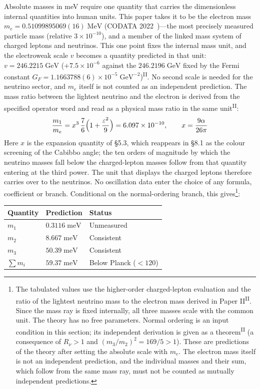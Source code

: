 \documentclass[12pt,a4paper]{article}
\newcommand{\PII}{\textsuperscript{\textup{II}}}
\begin{document}
\begin{sloppypar}
Absolute masses in meV require one quantity that carries the dimensionless internal quantities into human units. This paper takes it to be the electron mass $m_e = 0.51099895069(16)\;\mathrm{MeV}$ (CODATA 2022~\cite{codata})---the most precisely measured particle mass (relative $3\times10^{-10}$), and a member of the linked mass system of charged leptons and neutrinos. This one point fixes the internal mass unit, and the electroweak scale $v$ becomes a quantity predicted in that unit: $v = 246.2215\;\mathrm{GeV}$ ($+7.5\times10^{-6}$ against the $246.2196\;\mathrm{GeV}$ fixed by the Fermi constant $G_F = 1.1663788(6)\times10^{-5}\;\mathrm{GeV}^{-2}$)\PII{}. No second scale is needed for the neutrino sector, and $m_e$ itself is not counted as an independent prediction. The mass ratio between the lightest neutrino and the electron is derived from the specified operator word and read as a physical mass ratio in the same unit\PII{}:
\[\frac{m_1}{m_e} = x^3\,\frac{7}{6}\Bigl(1 + \frac{\varepsilon^2}{9}\Bigr) = 6.097 \times 10^{-10},\qquad x = \frac{9\alpha}{26\pi}\]
Here $x$ is the expansion quantity of \S5.3, which reappears in \S8.1 as the colour screening of the Cabibbo angle; the ten orders of magnitude by which the neutrino masses fall below the charged-lepton masses follow from that quantity entering at the third power. The unit that displays the charged leptons therefore carries over to the neutrinos. No oscillation data enter the choice of any formula, coefficient or branch. Conditional on the normal-ordering branch, this gives\footnote{The tabulated values use the higher-order charged-lepton evaluation and the ratio of the lightest neutrino mass to the electron mass derived in Paper II\PII{}. Since the mass ray is fixed internally, all three masses scale with the common unit. The theory has no free parameters. Normal ordering is an input condition in this section; its independent derivation is given as a theorem\PII{} (a consequence of $R_\nu > 1$ and $(m_3/m_2)^2 = 169/5 > 1$). These are predictions of the theory after setting the absolute scale with $m_e$. The electron mass itself is not an independent prediction, and the individual masses and their sum, which follow from the same mass ray, must not be counted as mutually independent predictions.}:
\end{sloppypar}

\begin{center}\small
\begin{tabular}{lll}
\toprule
Quantity & Prediction & Status \\
\midrule
$m_1$ & $0.3116\;\mathrm{meV}$ & Unmeasured \\
$m_2$ & $8.667\;\mathrm{meV}$  & Consistent \\
$m_3$ & $50.39\;\mathrm{meV}$ & Consistent \\
$\sum m_i$ & $59.37\;\mathrm{meV}$ & Below Planck ($<120$) \\
\bottomrule
\end{tabular}
\end{center}
\end{document}
